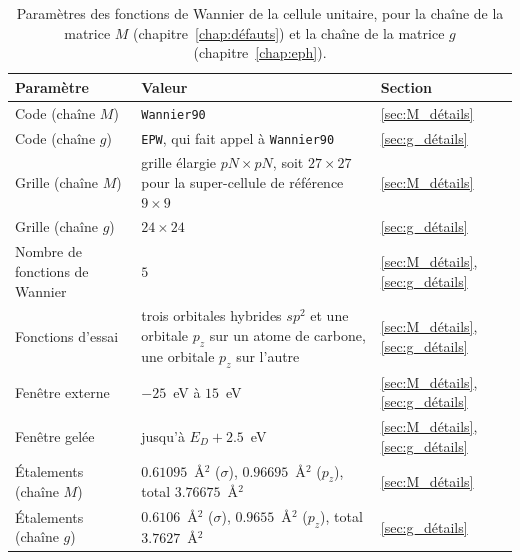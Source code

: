 \begin{table}[htbp]
    \centering
    \caption[Paramètres des fonctions de Wannier.]{Paramètres des fonctions de Wannier de la cellule unitaire, pour la chaîne de la matrice $M$ (chapitre~\ref{chap:défauts}) et la chaîne de la matrice $g$ (chapitre~\ref{chap:eph}).}
    \label{tab:param_wannier}
    \small
    \setlength{\tabcolsep}{4pt}
    \begin{tabular}{p{} p{} p{}}
        \hline\hline
        Paramètre & Valeur & Section \\
        \hline
        Code (chaîne $M$) & \texttt{Wannier90} & \ref{sec:M_détails} \\
        Code (chaîne $g$) & \texttt{EPW}, qui fait appel à \texttt{Wannier90} & \ref{sec:g_détails} \\
        Grille (chaîne $M$) & grille élargie $pN\times pN$, soit $27\times 27$ pour la super-cellule de référence $9\times 9$ & \ref{sec:M_détails} \\
        Grille (chaîne $g$) & $24\times 24$ & \ref{sec:g_détails} \\
        Nombre de fonctions de Wannier & $5$ & \ref{sec:M_détails}, \ref{sec:g_détails} \\
        Fonctions d'essai & trois orbitales hybrides $sp^2$ et une orbitale $p_z$ sur un atome de carbone, une orbitale $p_z$ sur l'autre & \ref{sec:M_détails}, \ref{sec:g_détails} \\
        Fenêtre externe & $-25$~eV à $15$~eV & \ref{sec:M_détails}, \ref{sec:g_détails} \\
        Fenêtre gelée & jusqu'à $E_D + 2.5$~eV & \ref{sec:M_détails}, \ref{sec:g_détails} \\
        Étalements (chaîne $M$) & $0.61095$~\AA$^2$ ($\sigma$), $0.96695$~\AA$^2$ ($p_z$), total $3.76675$~\AA$^2$ & \ref{sec:M_détails} \\
        Étalements (chaîne $g$) & $0.6106$~\AA$^2$ ($\sigma$), $0.9655$~\AA$^2$ ($p_z$), total $3.7627$~\AA$^2$ & \ref{sec:g_détails} \\
        \hline\hline
    \end{tabular}
\end{table}

